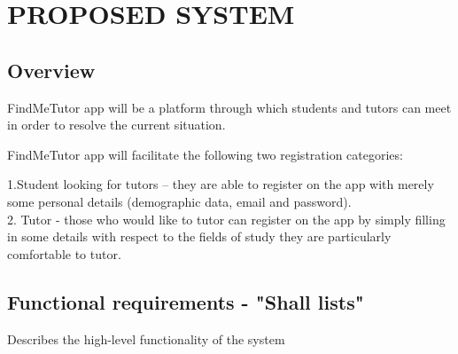 \documentclass[12pt]{article}
\begin{document}
\newpage

\section{PROPOSED SYSTEM}
\subsection{Overview}
\begin{flushleft}
FindMeTutor app will be a platform through which students and tutors can meet in order to resolve the current situation.
\end{flushleft}
\begin{flushleft}
FindMeTutor app will facilitate the following two registration categories:

\begin{flushleft}
1.Student looking for tutors – they are able to register on the app with merely some personal details (demographic data, email and password).\\
2. Tutor - those who would like to tutor can register on the app by simply filling in some details with respect to the fields of study they are particularly comfortable to tutor.\\
\end{flushleft}
\end{flushleft}
\subsection{Functional requirements - "Shall lists"}

Describes the high-level functionality of the system\\
\end{document}
